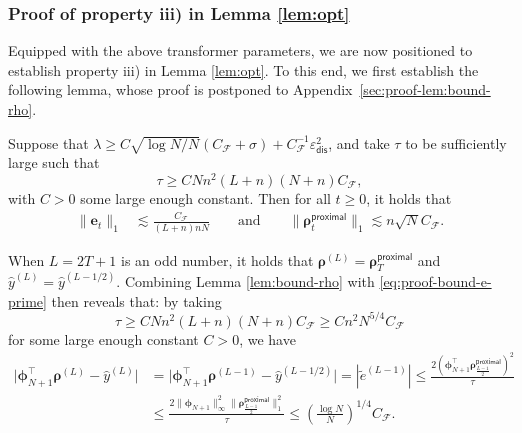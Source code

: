 \documentclass[english]{article}
\begin{document}
\subsubsection{Proof of property iii) in Lemma \ref{lem:opt}} 
%
Equipped with the above transformer parameters, we are now positioned to establish property iii) in Lemma \ref{lem:opt}.
To this end,
we first establish the following lemma, whose proof is postponed to Appendix~\ref{sec:proof-lem:bound-rho}.
%
\begin{lemma}\label{lem:bound-rho}
 Suppose that $\lambda\ge C\sqrt{\log N/N} (C_{\mathcal{F}} + \sigma) + C_{\mathcal{F}}^{-1}\varepsilon_{\mathsf{dis}}^2$, and take $\tau$ to be sufficiently large such that
$$
\tau \ge CNn^2(L+n)\left(N+ n\right)C_{\mathcal{F}},
$$
with $C>0$ some large enough constant.
Then for all $t\ge 0$, it holds that
%
\begin{align*}
\|{\bm e}_t\|_1&\lesssim \frac{C_{\mathcal{F}}}{(L+n)nN}\qquad\text{and}\qquad 
\big\|{\bm \rho}_t^{\mathsf{proximal}}\big\|_1\lesssim n\sqrt{N}C_{\mathcal{F}}.
\end{align*}
\end{lemma}

When $L = 2T+1$ is an odd number, it holds that ${\bm \rho}^{(L)} = {\bm \rho}_T^{\mathsf{proximal}}$ and $\widehat{y}^{(L)} = \widehat{y}^{(L-1/2)}$. 
Combining Lemma \ref{lem:bound-rho} with \eqref{eq:proof-bound-e-prime} then reveals that: 
by taking
%
$$
\tau \ge CNn^2(L+n)\left(N+ n\right)C_{\mathcal{F}} \ge C n^2N^{5/4}C_{\mathcal{F}}$$
%
for some large enough constant $C>0$, we have
%
\begin{align*}
\big|{\bm \phi}_{N+1}^{\top}{\bm \rho}^{(L)} - \widehat{y}^{(L)}\big| 
&= 
\big|{\bm \phi}_{N+1}^{\top}{\bm \rho}^{(L-1)} - \widehat{y}^{(L-1/2)}\big|  =|\widetilde{e}^{(L-1)}| \le \frac{2({\bm \phi}_{N+1}^{\top}{\bm \rho}_{\frac{L-1}{2}}^{\mathsf{proximal}})^2}{\tau} \\
& 
\le  \frac{2\|{\bm \phi}_{N+1}\|_{\infty}^2 \big\|{\bm \rho}_{\frac{L-1}{2}}^{\mathsf{proximal}} \big\|_1^2}{\tau}
\le \left(\frac{\log N}{N}\right)^{1/4}C_{\mathcal{F}}.
\end{align*}
\end{document}
